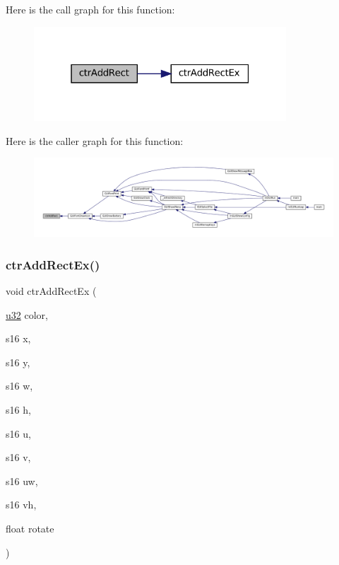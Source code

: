 Here is the call graph for this function\+:
\nopagebreak
\begin{figure}[H]
\begin{center}
\leavevmode
\includegraphics[width=268pt]{ctr-gpu_8c_a5a8136bc8fce40ba12da3cfaaa617bd4_cgraph}
\end{center}
\end{figure}
Here is the caller graph for this function\+:
\nopagebreak
\begin{figure}[H]
\begin{center}
\leavevmode
\includegraphics[width=350pt]{ctr-gpu_8c_a5a8136bc8fce40ba12da3cfaaa617bd4_icgraph}
\end{center}
\end{figure}
\mbox{\label{ctr-gpu_8c_aa59622aca4a180cff8a77bbc0397f4de}} 
\subsubsection{\texorpdfstring{ctr\+Add\+Rect\+Ex()}{ctrAddRectEx()}}
{\footnotesize\ttfamily void ctr\+Add\+Rect\+Ex (\begin{DoxyParamCaption}\item[{\mbox{\hyperlink{sqlite3_8c_a03ad5adfaeb9b7640dde78a0cc390319}{u32}}}]{color,  }\item[{s16}]{x,  }\item[{s16}]{y,  }\item[{s16}]{w,  }\item[{s16}]{h,  }\item[{s16}]{u,  }\item[{s16}]{v,  }\item[{s16}]{uw,  }\item[{s16}]{vh,  }\item[{float}]{rotate }\end{DoxyParamCaption})}

